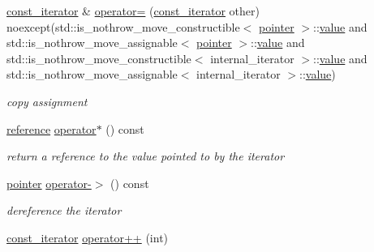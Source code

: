 \begin{DoxyCompactItemize}
\hyperlink{classnlohmann_1_1basic__json_1_1const__iterator}{const\+\_\+iterator} \& \hyperlink{classnlohmann_1_1basic__json_1_1const__iterator_a2b6561a7b39b9aa3a220aa3b6e2d9589}{operator=} (\hyperlink{classnlohmann_1_1basic__json_1_1const__iterator}{const\+\_\+iterator} other) noexcept(std\+::is\+\_\+nothrow\+\_\+move\+\_\+constructible$<$ \hyperlink{classnlohmann_1_1basic__json_1_1const__iterator_a1da96fc3054d547e7706d3a2f073f389}{pointer} $>$\+::\hyperlink{classnlohmann_1_1basic__json_1_1const__iterator_a0f42e99f14ac0a46456cf96fb384f290}{value} and std\+::is\+\_\+nothrow\+\_\+move\+\_\+assignable$<$ \hyperlink{classnlohmann_1_1basic__json_1_1const__iterator_a1da96fc3054d547e7706d3a2f073f389}{pointer} $>$\+::\hyperlink{classnlohmann_1_1basic__json_1_1const__iterator_a0f42e99f14ac0a46456cf96fb384f290}{value} and std\+::is\+\_\+nothrow\+\_\+move\+\_\+constructible$<$ internal\+\_\+iterator $>$\+::\hyperlink{classnlohmann_1_1basic__json_1_1const__iterator_a0f42e99f14ac0a46456cf96fb384f290}{value} and std\+::is\+\_\+nothrow\+\_\+move\+\_\+assignable$<$ internal\+\_\+iterator $>$\+::\hyperlink{classnlohmann_1_1basic__json_1_1const__iterator_a0f42e99f14ac0a46456cf96fb384f290}{value})
\begin{DoxyCompactList}\small\item\em copy assignment \end{DoxyCompactList}\item 
\hyperlink{classnlohmann_1_1basic__json_1_1const__iterator_aefd248cac6493eed1e6ff53ba6a63eb2}{reference} \hyperlink{classnlohmann_1_1basic__json_1_1const__iterator_acfc918b6350449111ca58af5eb3da999}{operator$\ast$} () const
\begin{DoxyCompactList}\small\item\em return a reference to the value pointed to by the iterator \end{DoxyCompactList}\item 
\hyperlink{classnlohmann_1_1basic__json_1_1const__iterator_a1da96fc3054d547e7706d3a2f073f389}{pointer} \hyperlink{classnlohmann_1_1basic__json_1_1const__iterator_abae808b09a822cc3da4cef0efb89115d}{operator-\/$>$} () const
\begin{DoxyCompactList}\small\item\em dereference the iterator \end{DoxyCompactList}\item 
\hyperlink{classnlohmann_1_1basic__json_1_1const__iterator}{const\+\_\+iterator} \hyperlink{classnlohmann_1_1basic__json_1_1const__iterator_a8dbaec5bf8ccba3225520356629061cb}{operator++} (int)

\end{DoxyCompactItemize}
